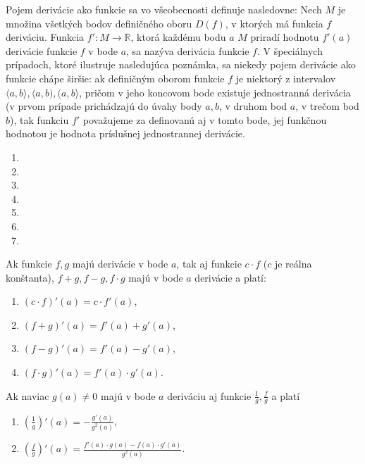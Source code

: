 Pojem derivácie ako funkcie sa vo všeobecnosti definuje nasledovne: Nech $M$ je množina všetkých bodov definičného oboru $D(f)$, v ktorých má funkcia $f$ deriváciu. Funkcia $f':M \rightarrow \mathbb{R}$, ktorá každému bodu $a$  $M$ priradí hodnotu $f'(a)$ derivácie funkcie $f$ v bode $a$, sa nazýva derivácia funkcie $f$. V špeciálnych prípadoch, ktoré ilustruje nasledujúca poznámka, sa niekedy pojem derivácie ako funkcie chápe širšie: ak definičným oborom funkcie $f$ je niektorý z intervalov $\langle a,b \rangle, \langle a,b),(a,b \rangle$, pričom v jeho koncovom bode existuje jednostranná derivácia (v prvom prípade prichádzajú do úvahy body $a,b$, v druhom bod $a$, v trečom bod $b$), tak funkciu $f'$ považujeme za definovanú aj v tomto bode, jej funkčnou hodnotou je hodnota príslušnej jednostrannej derivácie.

\begin{enumerate}[resume]
	\item {}
	\item {}
	\item {}
	\item {}
	\item {}
	\item {}
	\item {}
\end{enumerate}

\begin{veta}
Ak funkcie $f,g$ majú derivácie v bode $a$, tak aj funkcie $c \cdot f$ ($c$ je reálna konštanta), $f+g,f-g,f\cdot g$ majú v bode $a$ derivácie a platí:
\begin{enumerate}
\item $(c\cdot f)'(a)=c\cdot f'(a)$,
\item $(f+g)'(a)=f'(a)+g'(a)$,
\item $(f-g)'(a)=f'(a)-g'(a)$,
\item $(f\cdot g)'(a)=f'(a)\cdot g'(a)$.
\end{enumerate}
Ak naviac $g(a)\neq 0$ majú v bode $a$ deriváciu aj funkcie $\frac{1}{g},\frac{f}{g}$ a platí
\begin{enumerate}
\item $(\frac{1}{g})'(a)=-\frac{g'(a)}{g^2(a)}$,
\item $(\frac{f}{g})'(a)=\frac{f'(a)\cdot g(a)-f(a)\cdot g'(a)}{g^2 (a)}$.
\end{enumerate}
\end{veta}

